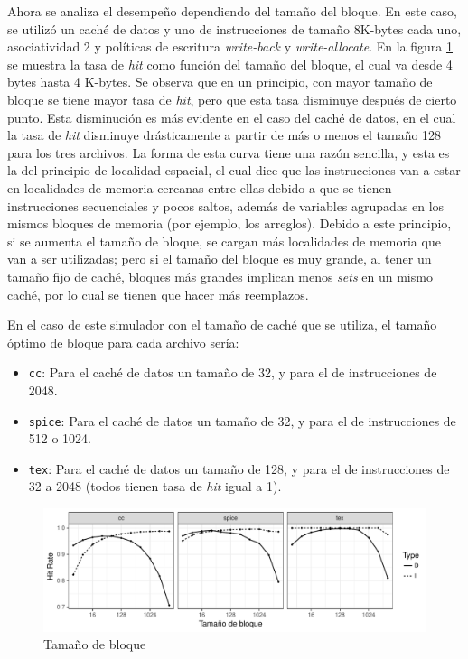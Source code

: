 \documentclass{article}
\begin{document}
Ahora se analiza el desempeño dependiendo del tamaño del bloque. En este caso, se utilizó un caché de datos y uno de instrucciones de tamaño 8K-bytes cada uno, asociatividad 2 y políticas de escritura \textit{write-back} y \textit{write-allocate}. En la figura \ref{fig:2_block_size} se muestra la tasa de \textit{hit} como función del tamaño del bloque, el cual va desde 4 bytes hasta 4 K-bytes. Se observa que en un principio, con mayor tamaño de bloque se tiene mayor tasa de \textit{hit}, pero que esta tasa disminuye después de cierto punto. Esta disminución es más evidente en el caso del caché de datos, en el cual la tasa de \textit{hit} disminuye drásticamente a partir de más o menos el tamaño 128 para los tres archivos. La forma de esta curva tiene una razón sencilla, y esta es la del principio de localidad espacial, el cual dice que las instrucciones van a estar en localidades de memoria cercanas entre ellas debido a que se tienen instrucciones secuenciales y pocos saltos, además de variables agrupadas en los mismos bloques de memoria (por ejemplo, los arreglos). Debido a este principio, si se aumenta el tamaño de bloque, se cargan más localidades de memoria que van a ser utilizadas; pero si el tamaño del bloque es muy grande, al tener un tamaño fijo de caché, bloques más grandes implican menos \textit{sets} en un mismo caché, por lo cual se tienen que hacer más reemplazos.

En el caso de este simulador con el tamaño de caché que se utiliza, el tamaño óptimo de bloque para cada archivo sería:

\begin{itemize}
    \item \texttt{cc}: Para el caché de datos un tamaño de 32, y para el de instrucciones de 2048.
    \item \texttt{spice}: Para el caché de datos un tamaño de 32, y para el de instrucciones de 512 o 1024.
    \item \texttt{tex}: Para el caché de datos un tamaño de 128, y para el de instrucciones de 32 a 2048 (todos tienen tasa de \textit{hit} igual a 1).
\end{itemize}


\begin{figure}[H]
    \centering
    \includegraphics[width=\textwidth]{2_block_size.pdf}
    \caption{Tamaño de bloque}
    \label{fig:2_block_size}
\end{figure}
\end{document}
